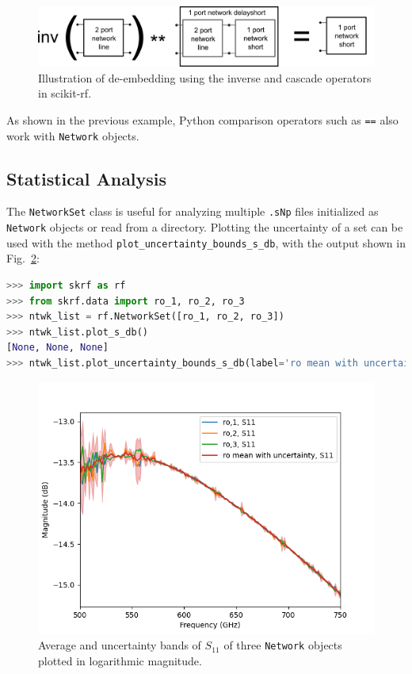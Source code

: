 \documentclass[journal, onecolumn]{IEEEtran}
\begin{document}
\begin{figure}
	\centering
	\includegraphics[width=0.95\linewidth]{figures/deembedding}
	\caption{Illustration of de-embedding using the inverse and cascade operators in scikit-rf.}
	\label{fig:deembedding}
\end{figure}

As shown in the previous example, Python comparison operators such as \texttt{==} also work with \texttt{Network} objects. 

\subsection{Statistical Analysis}
The \texttt{NetworkSet} class is useful for analyzing multiple \texttt{.sNp} files initialized as \texttt{Network} objects or read from a directory. Plotting the uncertainty of a set can be used with the method \texttt{plot\_uncertainty\_bounds\_s\_db}, with the output shown in Fig.~\ref{fig:figure5}:

\begin{lstlisting}[language=Python]
>>> import skrf as rf
>>> from skrf.data import ro_1, ro_2, ro_3
>>> ntwk_list = rf.NetworkSet([ro_1, ro_2, ro_3])
>>> ntwk_list.plot_s_db()
[None, None, None]
>>> ntwk_list.plot_uncertainty_bounds_s_db(label='ro mean with uncertainty, S11')
\end{lstlisting}

\begin{figure}
	\centering
	\includegraphics[width=0.95\linewidth]{figures/s11_uncertainty.png}
	\caption{Average and uncertainty bands of $S_{11}$ of three \texttt{Network} objects plotted in logarithmic magnitude.}
	\label{fig:figure5}
\end{figure}
\end{document}
